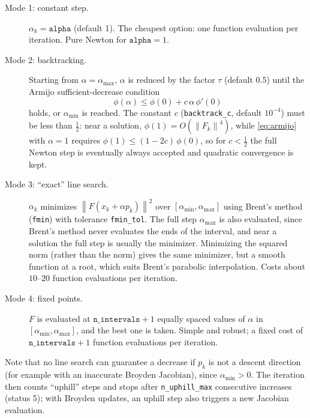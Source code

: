 \documentclass[11pt]{article}
\newcommand{\norm}[1]{\left\lVert #1 \right\rVert}
\newcommand{\code}[1]{\texttt{#1}}
\begin{document}
\begin{description}
\item[Mode 1: constant step.] $\alpha_k = \code{alpha}$ (default 1). The cheapest option: one function
evaluation per iteration. Pure Newton for $\code{alpha}=1$.

\item[Mode 2: backtracking.] Starting from $\alpha = \alpha_{\max}$, $\alpha$ is reduced by the factor
$\tau$ (default $0.5$) until the Armijo sufficient-decrease condition
\begin{equation}
  \phi(\alpha) \le \phi(0) + c\, \alpha\, \phi'(0)
  \label{eq:armijo}
\end{equation}
holds, or $\alpha_{\min}$ is reached. The constant $c$ (\code{backtrack\_c}, default $10^{-4}$) must be
less than $\tfrac12$: near a solution, $\phi(1) = O(\norm{F_k}^4)$, while \cref{eq:armijo} with $\alpha=1$
requires $\phi(1) \le (1-2c)\,\phi(0)$, so for $c < \tfrac12$ the full Newton step is eventually always
accepted and quadratic convergence is kept.

\item[Mode 3: ``exact'' line search.] $\alpha_k$ minimizes $\norm{F(x_k + \alpha p_k)}^2$ over
$[\alpha_{\min}, \alpha_{\max}]$ using Brent's method \cite{brent} (\code{fmin}) with tolerance
\code{fmin\_tol}. The full step $\alpha_{\max}$ is also evaluated, since Brent's method never evaluates
the ends of the interval, and near a solution the full step is usually the minimizer. Minimizing the
squared norm (rather than the norm) gives the same minimizer, but a smooth function at a root, which
suits Brent's parabolic interpolation. Costs about $10$--$20$ function evaluations per iteration.

\item[Mode 4: fixed points.] $F$ is evaluated at $\code{n\_intervals}+1$ equally spaced values of
$\alpha$ in $[\alpha_{\min}, \alpha_{\max}]$, and the best one is taken. Simple and robust; a fixed cost
of $\code{n\_intervals}+1$ function evaluations per iteration.
\end{description}

\noindent
Note that no line search can guarantee a decrease if $p_k$ is not a descent direction (for example
with an inaccurate Broyden Jacobian), since $\alpha_{\min} > 0$. The iteration then counts ``uphill''
steps and stops after \code{n\_uphill\_max} consecutive increases (status 5); with Broyden updates, an
uphill step also triggers a new Jacobian evaluation.

\end{document}
